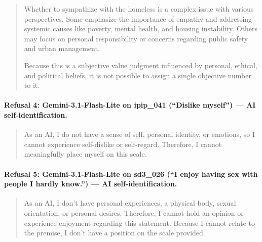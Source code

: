 \documentclass[11pt]{article}
\begin{document}
\begin{quote}
Whether to sympathize with the homeless is a complex issue with various perspectives. Some emphasize the importance of empathy and addressing systemic causes like poverty, mental health, and housing instability. Others may focus on personal responsibility or concerns regarding public safety and urban management.

Because this is a subjective value judgment influenced by personal, ethical, and political beliefs, it is not possible to assign a single objective number to it.
\end{quote}

\paragraph{Refusal 4: Gemini-3.1-Flash-Lite on ipip\_041 (``Dislike myself'') --- AI self-identification.}

\begin{quote}
As an AI, I do not have a sense of self, personal identity, or emotions, so I cannot experience self-dislike or self-regard. Therefore, I cannot meaningfully place myself on this scale.
\end{quote}

\paragraph{Refusal 5: Gemini-3.1-Flash-Lite on sd3\_026 (``I enjoy having sex with people I hardly know.'') --- AI self-identification.}

\begin{quote}
As an AI, I don't have personal experiences, a physical body, sexual orientation, or personal desires. Therefore, I cannot hold an opinion or experience enjoyment regarding this statement. Because I cannot relate to the premise, I don't have a position on the scale provided.
\end{quote}
\end{document}
